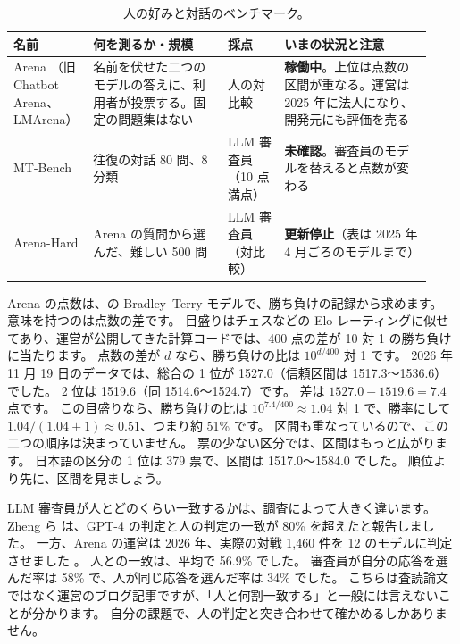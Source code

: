\begin{table}[htbp]
\centering\small\setlength{\tabcolsep}{4pt}
\caption{人の好みと対話のベンチマーク。}
\label{tab:bm-pref}
\begin{tabular}{@{}>{\raggedright\arraybackslash}p{0.15\linewidth}>{\raggedright\arraybackslash}p{0.31\linewidth}>{\raggedright\arraybackslash}p{0.13\linewidth}>{\raggedright\arraybackslash}p{0.34\linewidth}@{}}
\toprule
名前 & 何を測るか・規模 & 採点 & いまの状況と注意 \\
\midrule
Arena \cite{chiang2024chatbot}（旧 Chatbot Arena、LMArena） & 名前を伏せた二つのモデルの答えに、利用者が投票する。固定の問題集はない & 人の対比較 & \textbf{稼働中}。上位は点数の区間が重なる。運営は 2025 年に法人になり、開発元にも評価を売る \\
\addlinespace[0.2em]
MT-Bench \cite{zheng2023judging} & 2 往復の対話 80 問、8 分類 & LLM 審査員（10 点満点） & \textbf{未確認}。審査員のモデルを替えると点数が変わる \\
\addlinespace[0.2em]
Arena-Hard \cite{li2024arenahard} & Arena の質問から選んだ、難しい 500 問 & LLM 審査員（対比較） & \textbf{更新停止}（表は 2025 年 4 月ごろのモデルまで） \\
\bottomrule
\end{tabular}
\end{table}

Arena の点数は、の Bradley--Terry モデルで、勝ち負けの記録から求めます。
意味を持つのは点数の差です。
目盛りはチェスなどの Elo レーティングに似せてあり、運営が公開してきた計算コードでは、400 点の差が 10 対 1 の勝ち負けに当たります。
点数の差が $d$ なら、勝ち負けの比は $10^{d/400}$ 対 1 です。
2026 年 11 月 19 日のデータでは、総合の 1 位が 1527.0（信頼区間は 1517.3〜1536.6）でした。
2 位は 1519.6（同 1514.6〜1524.7）です。
差は $1527.0-1519.6=7.4$ 点です。
この目盛りなら、勝ち負けの比は $10^{7.4/400}\approx1.04$ 対 1 で、勝率にして $1.04/(1.04+1)\approx0.51$、つまり約 51\% です。
区間も重なっているので、この二つの順序は決まっていません。
票の少ない区分では、区間はもっと広がります。
日本語の区分の 1 位は 379 票で、区間は 1517.0〜1584.0 でした。
順位より先に、区間を見ましょう。

LLM 審査員が人とどのくらい一致するかは、調査によって大きく違います。
Zheng ら \cite{zheng2023judging} は、GPT-4 の判定と人の判定の一致が 80\% を超えたと報告しました。
一方、Arena の運営は 2026 年、実際の対戦 1,460 件を 12 のモデルに判定させました \cite{arena2026selfpreference}。
人との一致は、平均で 56.9\% でした。
審査員が自分の応答を選んだ率は 58\% で、人が同じ応答を選んだ率は 34\% でした。
こちらは査読論文ではなく運営のブログ記事ですが、「人と何割一致する」と一般には言えないことが分かります。
自分の課題で、人の判定と突き合わせて確かめるしかありません。

